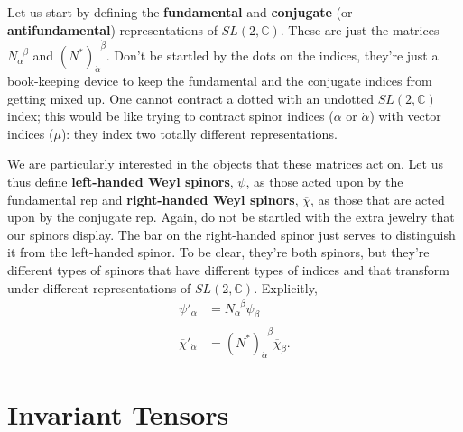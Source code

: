 \documentclass[12pt]{article}
\numberwithin{equation}{section}    %
\begin{document}
Let us start by defining the \textbf{fundamental} and \textbf{conjugate} (or \textbf{antifundamental}) representations of $SL(2,\mathbb C)$. These are just the matrices $N_\alpha^{\phantom\alpha\beta}$ and $(N^*)_{\dot\alpha}^{\phantom\alpha\dot\beta}$. Don't be startled by the dots on the indices, they're just a book-keeping device to keep the fundamental and the conjugate indices from getting mixed up. One cannot contract a dotted with an undotted $SL(2,\mathbb C)$ index; this would be like trying to contract spinor indices ($\alpha$ or $\dot\alpha$) with vector indices ($\mu$): they index two totally different representations.%

We are particularly interested in the objects that these matrices act on. Let us thus define \textbf{left-handed Weyl spinors}, $\psi$, as those acted upon by the fundamental rep and \textbf{right-handed Weyl spinors}, $\overline\chi$, as those that are acted upon by the conjugate rep. Again, do not be startled with the extra jewelry that our spinors display. The bar on the right-handed spinor just serves to distinguish it from the left-handed spinor. To be clear, they're both spinors, but they're different types of spinors that have different types of indices and that transform under different representations of $SL(2,\mathbb C)$. Explicitly,
\begin{align}
	\psi'_\alpha &= N_\alpha^{\phantom\alpha\beta} \psi_\beta \\
	\overline\chi'_{\dot{\alpha}} &= \left(N^*\right)_{\dot{\alpha}}^{\phantom{\dot{\alpha}}\dot{\beta}}\overline\chi_{\dot{\beta}}.	
\end{align}


\section{Invariant Tensors} %
\end{document}
